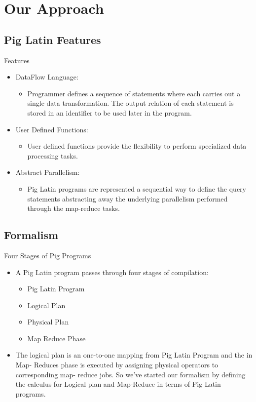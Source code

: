 \section{Our Approach}

\subsection{Pig Latin Features}
\begin{frame}{Features}
\begin{itemize}
	\item DataFlow Language:
	\begin{itemize}
		\item Programmer defines a sequence of statements where each carries out a single 					  data transformation. The output relation of each statement is stored in an  					  identifier to be used later in the program.
	\end{itemize}
	\item User Defined Functions:
	\begin{itemize}
		\item User defined functions provide the flexibility to perform specialized data 				 	  processing tasks.
	\end{itemize}
	\item Abstract Parallelism:
	\begin{itemize}
		\item Pig Latin programs are represented a sequential way to define the query 					      statements abstracting away the underlying parallelism performed through the 					  map-reduce tasks.
	\end{itemize}
\end{itemize}
\end{frame}

\subsection{Formalism}
\begin{frame}{Four Stages of Pig Programs}
\begin{itemize}
	\item A Pig Latin program passes through four stages of compilation:
	\begin{itemize}
		\item Pig Latin Program
		\item Logical Plan
		\item Physical Plan
		\item Map Reduce Phase
	\end{itemize}
	\item The logical plan is an one-to-one mapping from Pig Latin Program and the in Map-				  Reduces phase is executed by assigning physical operators to corresponding map-				  reduce jobs. So we've started our formalism by defining the calculus for Logical 				  plan and Map-Reduce in terms of Pig Latin programs.
\end{itemize}
\end{frame}

